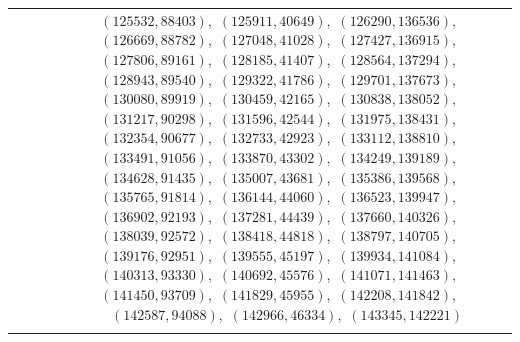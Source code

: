 \documentclass[11pt]{article}
\begin{document}
\begin{longtable}{@{}rrl>{\raggedright\arraybackslash}p{}@{}}
$(125532,88403)$,\allowbreak\ $(125911,40649)$,\allowbreak\ $(126290,136536)$,\allowbreak\ $(126669,88782)$,\allowbreak\ $(127048,41028)$,\allowbreak\ $(127427,136915)$,\allowbreak\ $(127806,89161)$,\allowbreak\ $(128185,41407)$,\allowbreak\ $(128564,137294)$,\allowbreak\ $(128943,89540)$,\allowbreak\ $(129322,41786)$,\allowbreak\ $(129701,137673)$,\allowbreak\ $(130080,89919)$,\allowbreak\ $(130459,42165)$,\allowbreak\ $(130838,138052)$,\allowbreak\ $(131217,90298)$,\allowbreak\ $(131596,42544)$,\allowbreak\ $(131975,138431)$,\allowbreak\ $(132354,90677)$,\allowbreak\ $(132733,42923)$,\allowbreak\ $(133112,138810)$,\allowbreak\ $(133491,91056)$,\allowbreak\ $(133870,43302)$,\allowbreak\ $(134249,139189)$,\allowbreak\ $(134628,91435)$,\allowbreak\ $(135007,43681)$,\allowbreak\ $(135386,139568)$,\allowbreak\ $(135765,91814)$,\allowbreak\ $(136144,44060)$,\allowbreak\ $(136523,139947)$,\allowbreak\ $(136902,92193)$,\allowbreak\ $(137281,44439)$,\allowbreak\ $(137660,140326)$,\allowbreak\ $(138039,92572)$,\allowbreak\ $(138418,44818)$,\allowbreak\ $(138797,140705)$,\allowbreak\ $(139176,92951)$,\allowbreak\ $(139555,45197)$,\allowbreak\ $(139934,141084)$,\allowbreak\ $(140313,93330)$,\allowbreak\ $(140692,45576)$,\allowbreak\ $(141071,141463)$,\allowbreak\ $(141450,93709)$,\allowbreak\ $(141829,45955)$,\allowbreak\ $(142208,141842)$,\allowbreak\ $(142587,94088)$,\allowbreak\ $(142966,46334)$,\allowbreak\ $(143345,142221)$\\
\addlinespace[3pt]
\end{longtable}
\endgroup
\end{document}
